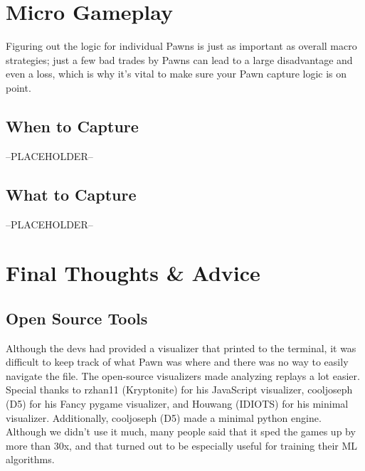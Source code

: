 \documentclass{article}
\begin{document}
\section{Micro Gameplay}
\hspace{\parindent}
Figuring out the logic for individual Pawns is just as important as overall macro strategies; just a few bad trades by Pawns can lead to a large disadvantage and even a loss, which is why it’s vital to make sure your Pawn capture logic is on point.

\subsection{When to Capture}
\hspace{\parindent}
--PLACEHOLDER--

\subsection{What to Capture}
\hspace{\parindent}
--PLACEHOLDER--

\section{Final Thoughts \& Advice}

\subsection{Open Source Tools}
\hspace{\parindent}
Although the devs had provided a visualizer that printed to the terminal, it was difficult to keep track of what Pawn was where and there was no way to easily navigate the file. The open-source visualizers made analyzing replays a lot easier. Special thanks to rzhan11 (Kryptonite) for his JavaScript visualizer, cooljoseph (D5) for his Fancy pygame visualizer, and Houwang (IDIOTS) for his minimal visualizer.
\bigbreak
Additionally, cooljoseph (D5) made a minimal python engine. Although we didn’t use it much, many people said that it sped the games up by more than 30x, and that turned out to be especially useful for training their ML algorithms.
\end{document}
